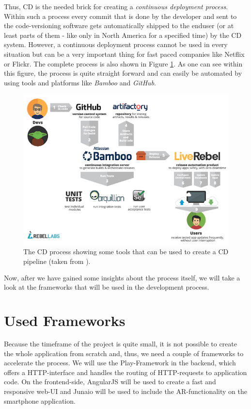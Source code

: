 Thus, \ac{CD} is the needed brick for creating a \emph{continuous deployment process}. Within such a process every commit that is done by the developer and sent to the code-versioning software gets automatically shipped to the enduser (or at least parts of them - like only in North America for a specified time) by the \ac{CD} system. However, a continuous deployment process cannot be used in every situation but can be a very important thing for fast paced companies like Netflix or Flickr. The complete process is also shown in Figure \ref{hip:cd}. As one can see within this figure, the process is quite straight forward and can easily be automated by using tools and platforms like \emph{Bamboo} and \emph{GitHub}.

\begin{figure}[th]
\centerline{\includegraphics[width=1\textwidth]{gfx/continuous-delivery}}
\caption{The \ac{CD} process showing some tools that can be used to create a \ac{CD} pipeline (taken from \cite{Wattson:2013aa}).}
\label{hip:cd}
\end{figure}

Now, after we have gained some insights about the process itself, we will take a look at the frameworks that will be used in the development process.

\section{Used Frameworks}
Because the timeframe of the project is quite small, it is not possible to create the whole application from scratch and, thus, we need a couple of frameworks to accelerate the process. We will use the Play-Framework in the backend, which offers a \ac{HTTP}-interface and handles the routing of \ac{HTTP}-requests to application code. On the frontend-side, AngularJS will be used to create a fast and responsive web-\ac{UI} and Junaio will be used to include the \ac{AR}-functionality on the smartphone application.

